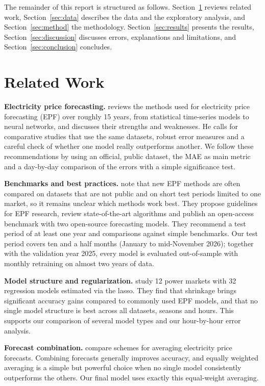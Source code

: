 \documentclass[12pt,oneside]{article}
\begin{document}
The remainder of this report is structured as follows. Section~\ref{sec:related} reviews related work, Section~\ref{sec:data} describes the data and the exploratory analysis, and Section~\ref{sec:method} the methodology. Section~\ref{sec:results} presents the results, Section~\ref{sec:discussion} discusses errors, explanations and limitations, and Section~\ref{sec:conclusion} concludes.

\section{Related Work} \label{sec:related}

\textbf{Electricity price forecasting.} \citet{weron2014} reviews the methods used for electricity price forecasting (EPF) over roughly 15 years, from statistical time-series models to neural networks, and discusses their strengths and weaknesses. He calls for comparative studies that use the same datasets, robust error measures and a careful check of whether one model really outperforms another. We follow these recommendations by using an official, public dataset, the MAE as main metric and a day-by-day comparison of the errors with a simple significance test.

\textbf{Benchmarks and best practices.} \citet{lago2021} note that new EPF methods are often compared on datasets that are not public and on short test periods limited to one market, so it remains unclear which methods work best. They propose guidelines for EPF research, review state-of-the-art algorithms and publish an open-access benchmark with two open-source forecasting models. They recommend a test period of at least one year and comparisons against simple benchmarks. Our test period covers ten and a half months (January to mid-November 2026); together with the validation year 2025, every model is evaluated out-of-sample with monthly retraining on almost two years of data.

\textbf{Model structure and regularization.} \citet{ziel2018} study 12 power markets with 32 regression models estimated via the lasso. They find that shrinkage brings significant accuracy gains compared to commonly used EPF models, and that no single model structure is best across all datasets, seasons and hours. This supports our comparison of several model types and our hour-by-hour error analysis.

\textbf{Forecast combination.} \citet{nowotarski2014} compare schemes for averaging electricity price forecasts. Combining forecasts generally improves accuracy, and equally weighted averaging is a simple but powerful choice when no single model consistently outperforms the others. Our final model uses exactly this equal-weight averaging.
\end{document}
